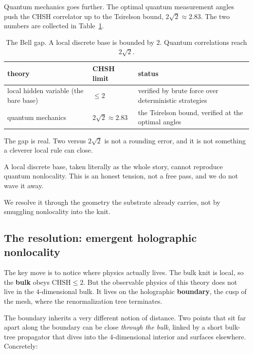 Quantum mechanics goes further. The optimal quantum measurement angles push the CHSH correlator up to the Tsirelson bound, $2\sqrt{2} \approx 2.83$. The two numbers are collected in Table~\ref{tab:bell-bounds}.

\begin{table}[ht]
\centering
\begin{tabular}{@{}lll@{}}
\toprule
theory & CHSH limit & status \\
\midrule
local hidden variable (the bare base) & $\le 2$ & verified by brute force over deterministic strategies \\
quantum mechanics & $2\sqrt{2} \approx 2.83$ & the Tsirelson bound, verified at the optimal angles \\
\bottomrule
\end{tabular}
\caption{The Bell gap. A local discrete base is bounded by $2$. Quantum correlations reach $2\sqrt{2}$.}
\label{tab:bell-bounds}
\end{table}

The gap is real. Two versus $2\sqrt{2}$ is not a rounding error, and it is not something a cleverer local rule can close.

\begin{principle}
A local discrete base, taken literally as the whole story, cannot reproduce quantum nonlocality. This is an honest tension, not a free pass, and we do not wave it away.
\end{principle}

We resolve it through the geometry the substrate already carries, not by smuggling nonlocality into the knit.

\subsection{The resolution: emergent holographic nonlocality}

The key move is to notice where physics actually lives. The bulk knit is local, so the \textbf{bulk} obeys $\mathrm{CHSH} \le 2$. But the observable physics of this theory does not live in the $4$-dimensional bulk. It lives on the holographic \textbf{boundary}, the cusp of the mesh, where the renormalization tree terminates.

The boundary inherits a very different notion of distance. Two points that sit far apart along the boundary can be close \emph{through the bulk}, linked by a short bulk-tree propagator that dives into the $4$-dimensional interior and surfaces elsewhere. Concretely:

